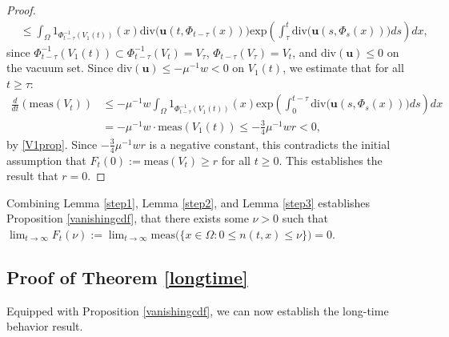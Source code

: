 \documentclass[12pt]{article}
\newcommand{\bd}{\boldsymbol}
\theoremstyle{plain}
\begin{document}
\begin{proof}
\begin{align*}
&\le \int_{\Omega} 1_{\Phi_{t - \tau}^{-1}(V_{1}(t))}(x) \text{div}\Big(\bd{u}(t, \Phi_{t - \tau}(x))\Big) \text{exp}\left(\int_{\tau}^{t} \text{div}\Big(\bd{u}(s, \Phi_{s}(x))\Big) ds\right) dx,
\end{align*}
since $\Phi_{t - \tau}^{-1}(V_{1}(t)) \subset \Phi_{t - \tau}^{-1}(V_{t}) = V_{\tau}$, $\Phi_{t - \tau}(V_{\tau}) = V_{t}$, and $\text{div}(\bd{u}) \le 0$ on the vacuum set. Since $\text{div}(\bd{u}) \le -\mu^{-1}w < 0$ on $V_{1}(t)$, we estimate that for all $t \ge \tau$:
\begin{align*}
\frac{d}{dt}(\text{meas}(V_{t})) &\le -\mu^{-1}w \int_{\Omega} 1_{\Phi_{t - \tau}^{-1}(V_{1}(t))}(x) \text{exp}\left(\int_{0}^{t - \tau} \text{div}\Big(\bd{u}(s, \Phi_{s}(x))\Big) ds\right) dx \\
&= -\mu^{-1}w \cdot \text{meas}(V_{1}(t)) \le -\frac{3}{4}\mu^{-1}wr < 0,
\end{align*}
by \eqref{V1prop}. Since $\displaystyle -\frac{3}{4}\mu^{-1}wr$ is a negative constant, this contradicts the initial assumption that $F_{t}(0) := \text{meas}(V_{t}) \ge r$ for all $t \ge 0$. This establishes the result that $r = 0$.
\end{proof}

Combining Lemma \ref{step1}, Lemma \ref{step2}, and Lemma \ref{step3} establishes Proposition \ref{vanishingcdf}, that there exists some $\nu > 0$ such that $\lim_{t \to \infty} F_{t}(\nu) := \lim_{t \to \infty} \text{meas}\Big(\{x \in \Omega : 0 \le n(t, x) \le \nu\}\Big) = 0$.

\subsection{Proof of Theorem \ref{longtime}}\label{finalproof}

Equipped with Proposition \ref{vanishingcdf}, we can now establish the long-time behavior result.
\end{document}
